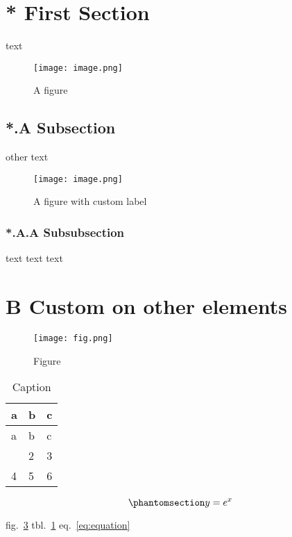 \section{* First Section}\label{first-section}

text

\begin{figure}
\label{fig:fig1}
\centering
\texttt{[image: image.png]}
\caption{A figure}\label{fig:fig1}
\end{figure}

\subsection{*.A Subsection}\label{subsection}

other text

\begin{figure}
\label{fig:fig2}
\centering
\texttt{[image: image.png]}
\caption{A figure with custom label}\label{fig:fig2}
\end{figure}

\subsubsection{*.A.A Subsubsection}\label{subsubsection}

text text text

\section{B Custom on other elements}\label{custom-on-other-elements}

\begin{figure}
\label{fig:fig3}
\centering
\texttt{[image: fig.png]}
\caption{Figure}\label{fig:fig3}
\end{figure}

\label{tbl:table}
\begin{longtable}[]{@{}lll@{}}
\caption{\label{tbl:table}Caption}\tabularnewline
\toprule\noalign{}
a & b & c \\
\midrule\noalign{}
\endfirsthead
\toprule\noalign{}
a & b & c \\
\midrule\noalign{}
\endhead
\bottomrule\noalign{}
\endlastfoot
1 & 2 & 3 \\
4 & 5 & 6 \\
\end{longtable}

\begin{equation}\phantomsection\label{eq:equation}{y = e^x}\label{eq:equation}\end{equation}

fig.~\ref{fig:fig3} tbl.~\ref{tbl:table} eq.~\ref{eq:equation}
